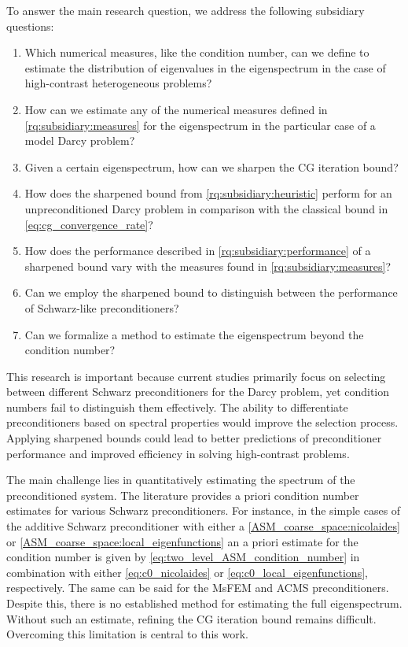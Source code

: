 \begin{subsidiaryq} \label{rq:subsidiaries}
    To answer the main research question, we address the following subsidiary questions:
    \setlength\itemindent{1in}
    \begin{enumerate}[label=\textbf{Q\arabic*}, ref=Q\arabic*, leftmargin=1cm]
        \item\label{rq:subsidiary:measures} Which numerical measures, like the condition number, can we define to estimate the distribution of eigenvalues in the eigenspectrum in the case of high-contrast heterogeneous problems?
        \item\label{rq:subsidiary:estimation} How can we estimate any of the numerical measures defined in \ref{rq:subsidiary:measures} for the eigenspectrum in the particular case of a model Darcy problem?
        \item\label{rq:subsidiary:heuristic} Given a certain eigenspectrum, how can we sharpen the CG iteration bound?
        \item\label{rq:subsidiary:performance} How does the sharpened bound from \ref{rq:subsidiary:heuristic} perform for an unpreconditioned Darcy problem in comparison with the classical bound in \cref{eq:cg_convergence_rate}?
        \item\label{rq:subsidiary:dependance} How does the performance described in \ref{rq:subsidiary:performance} of a sharpened bound vary with the measures found in \ref{rq:subsidiary:measures}?
        \item\label{rq:subsidiary:preconditioners} Can we employ the sharpened bound to distinguish between the performance of Schwarz-like preconditioners? 
        \item\label{rq:subsidiary:formilization} Can we formalize a method to estimate the eigenspectrum beyond the condition number?
    \end{enumerate}
\end{subsidiaryq}

This research is important because current studies primarily focus on selecting between different Schwarz preconditioners for the Darcy problem, yet condition numbers fail to distinguish them effectively. The ability to differentiate preconditioners based on spectral properties would improve the selection process. Applying sharpened bounds could lead to better predictions of preconditioner performance and improved efficiency in solving high-contrast problems.

The main challenge lies in quantitatively estimating the spectrum of the preconditioned system. The literature provides a priori condition number estimates for various Schwarz preconditioners. For instance, in the simple cases of the additive Schwarz preconditioner with either a \cref{ASM_coarse_space:nicolaides} or \cref{ASM_coarse_space:local_eigenfunctions} an a priori estimate for the condition number is given by \cref{eq:two_level_ASM_condition_number} in combination with either \cref{eq:c0_nicolaides} or \cref{eq:c0_local_eigenfunctions}, respectively. The same can be said for the MsFEM and ACMS preconditioners. Despite this, there is no established method for estimating the full eigenspectrum. Without such an estimate, refining the CG iteration bound remains difficult. Overcoming this limitation is central to this work.